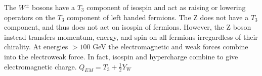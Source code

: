 		The $W^\pm$ bosons have a $T_3$ component of isospin and act as raising or lowering operators on the $T_3$ component of left handed fermions. The Z does not have a $T_3$ component, and thus does not act on isospin of fermions. However, the Z boson instead transfers momentum, energy, and spin on all fermions irregardless of their chirality. At energies $> 100 $ \unit{GeV} the electromagnetic and weak forces combine into the electroweak force. In fact, isospin and hypercharge combine to give electromagnetic charge. $Q_{EM} = T_3 + \frac{1}{2} Y_W$

